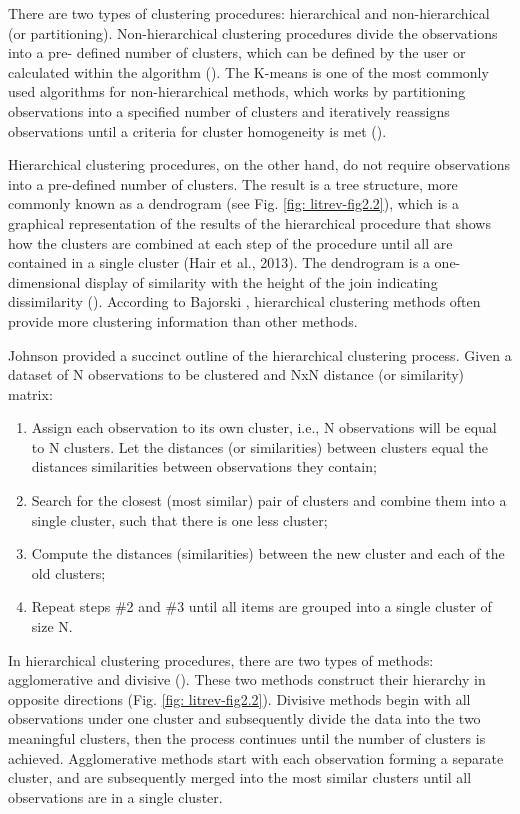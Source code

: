 There are two types of clustering procedures: hierarchical and non-hierarchical (or partitioning). Non-hierarchical clustering procedures divide the observations into a pre- defined number of clusters, which can be defined by the user or calculated within the algorithm (\cite{bajorski_statistics_2011}). The K-means is one of the most commonly used algorithms for non-hierarchical methods, which works by partitioning observations into a specified number of clusters and iteratively reassigns observations until a criteria for cluster homogeneity is met (\cite{hair_multivariate_2013}).

Hierarchical clustering procedures, on the other hand, do not require observations into a pre-defined number of clusters. The result is a tree structure, more commonly known as a dendrogram (see Fig. \ref{fig: litrev-fig2.2}), which is a graphical representation of the results of the hierarchical procedure that shows how the clusters are combined at each step of the procedure until all are contained in a single cluster (Hair et al., 2013). The dendrogram is a one-dimensional display of similarity with the height of the join indicating dissimilarity (\cite{ripley_pattern_1996}). According to Bajorski \citeyearpar{bajorski_statistics_2011}, hierarchical clustering methods often provide more clustering information than other methods.

Johnson \citeyearpar{johnson_hierarchical_1967} provided a succinct outline of the hierarchical clustering process. Given a dataset of N observations to be clustered and NxN distance (or similarity) matrix:

\begin{enumerate}
	\item Assign each observation to its own cluster, i.e., N observations will be equal to N clusters. Let the distances (or similarities) between clusters equal the distances similarities between observations they contain;
	\item Search for the closest (most similar) pair of clusters and combine them into a single cluster, such that there is one less cluster;
	\item Compute the distances (similarities) between the new cluster and each of the old clusters;
	\item Repeat steps \#2 and \#3 until all items are grouped into a single cluster of size N.
\end{enumerate}

In hierarchical clustering procedures, there are two types of methods: agglomerative and divisive (\cite{kaufman_introduction_1990}). These two methods construct their hierarchy in opposite directions (Fig. \ref{fig: litrev-fig2.2}). Divisive methods begin with all observations under one cluster and subsequently divide the data into the two meaningful clusters, then the process continues until the number of clusters is achieved. Agglomerative methods start with each observation forming a separate cluster, and are subsequently merged into the most similar clusters until all observations are in a single cluster.

